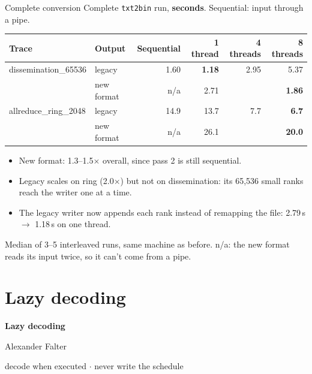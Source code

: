 \documentclass[aspectratio=169,11pt]{beamer}
\begin{document}
\begin{frame}{Complete conversion}
\small
Complete \texttt{txt2bin} run, \textbf{seconds}. Sequential: input through a pipe.
\vspace{2mm}

\centering
\footnotesize
\begin{tabular}{llrrrr}
\toprule
\textbf{Trace} & \textbf{Output} & \textbf{Sequential} & \textbf{1 thread} & \textbf{4 threads} & \textbf{8 threads} \\
\midrule
dissemination\_65536 & legacy & 1.60 & \textbf{1.18} & 2.95 & 5.37 \\
 & new format & n/a & 2.71 & & \textbf{1.86} \\
allreduce\_ring\_2048 & legacy & 14.9 & 13.7 & 7.7 & \textbf{6.7} \\
 & new format & n/a & 26.1 & & \textbf{20.0} \\
\bottomrule
\end{tabular}
\par\raggedright\vspace{3mm}
\small
\begin{itemize}
\item New format: 1.3--1.5$\times$ overall, since pass 2 is still sequential.
\item Legacy scales on ring (2.0$\times$) but not on dissemination: its 65,536 small ranks reach the writer one at a time.
\item The legacy writer now appends each rank instead of remapping the file: 2.79\,s $\to$ 1.18\,s on one thread.
\end{itemize}
{\scriptsize\color{black!60}\par
Median of 3--5 interleaved runs, same machine as before. n/a: the new format reads its input twice, so it can't come from a pipe.}
\end{frame}

\section{Lazy decoding}

\begin{frame}
\centering\vfill
{\Huge\bfseries Lazy decoding\par}
\vspace{4mm}
{\large Alexander Falter\par}
\vspace{3mm}
{\small\color{black!60}decode when executed $\cdot$ never write the schedule\par}
\vfill
\end{frame}
\end{document}
